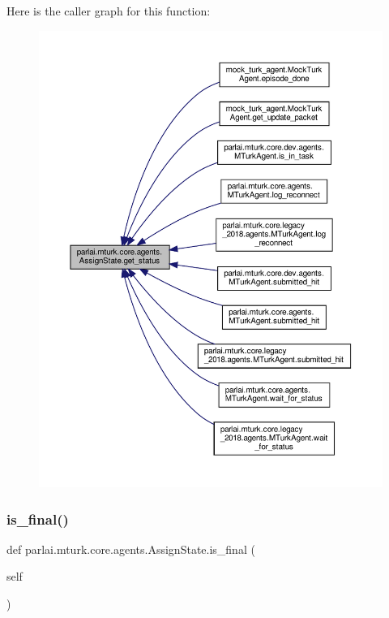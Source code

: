 Here is the caller graph for this function\+:
\nopagebreak
\begin{figure}[H]
\begin{center}
\leavevmode
\includegraphics[width=350pt]{classparlai_1_1mturk_1_1core_1_1agents_1_1AssignState_a14f5a0cbaf099fb25cfa284a502a8275_icgraph}
\end{center}
\end{figure}
\mbox{\label{classparlai_1_1mturk_1_1core_1_1agents_1_1AssignState_a95b2a76b6e8ec7e045542450ee49f971}} 
\subsubsection{\texorpdfstring{is\+\_\+final()}{is\_final()}}
{\footnotesize\ttfamily def parlai.\+mturk.\+core.\+agents.\+Assign\+State.\+is\+\_\+final (\begin{DoxyParamCaption}\item[{}]{self }\end{DoxyParamCaption})}

